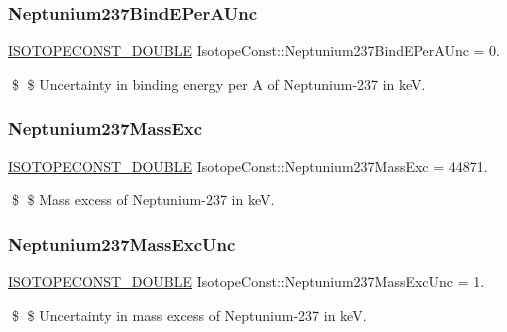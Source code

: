 \subsubsection{\texorpdfstring{Neptunium237\+Bind\+E\+Per\+A\+Unc}{Neptunium237BindEPerAUnc}}
{\footnotesize\ttfamily \mbox{\hyperlink{group___isotope_const-_macros_ga8f45a7272ce02c0b4c65c44636ed719a}{I\+S\+O\+T\+O\+P\+E\+C\+O\+N\+S\+T\+\_\+\+D\+O\+U\+B\+LE}} Isotope\+Const\+::\+Neptunium237\+Bind\+E\+Per\+A\+Unc = 0.}

\$ \$ Uncertainty in binding energy per A of Neptunium-\/237 in keV. \mbox{\label{group___isotope_const-_neptunium-_np237_ga9516d6f1aa80aa69c542f74d213d2ef9}} 
\subsubsection{\texorpdfstring{Neptunium237\+Mass\+Exc}{Neptunium237MassExc}}
{\footnotesize\ttfamily \mbox{\hyperlink{group___isotope_const-_macros_ga8f45a7272ce02c0b4c65c44636ed719a}{I\+S\+O\+T\+O\+P\+E\+C\+O\+N\+S\+T\+\_\+\+D\+O\+U\+B\+LE}} Isotope\+Const\+::\+Neptunium237\+Mass\+Exc = 44871.}

\$ \$ Mass excess of Neptunium-\/237 in keV. \mbox{\label{group___isotope_const-_neptunium-_np237_ga32a09b5776683e26d8beafdec5f374cb}} 
\subsubsection{\texorpdfstring{Neptunium237\+Mass\+Exc\+Unc}{Neptunium237MassExcUnc}}
{\footnotesize\ttfamily \mbox{\hyperlink{group___isotope_const-_macros_ga8f45a7272ce02c0b4c65c44636ed719a}{I\+S\+O\+T\+O\+P\+E\+C\+O\+N\+S\+T\+\_\+\+D\+O\+U\+B\+LE}} Isotope\+Const\+::\+Neptunium237\+Mass\+Exc\+Unc = 1.}

\$ \$ Uncertainty in mass excess of Neptunium-\/237 in keV. \mbox{\label{group___isotope_const-_neptunium-_np237_gac35b14852937390cbec28a96f0ef040a}} 
